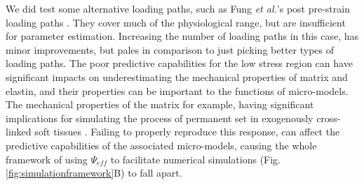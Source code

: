     We did test some alternative loading paths, such as Fung \textit{et al.}'s post pre-strain loading paths \cite{fung_pseudoelasticity_1979}. They cover much of the physiological range, but are insufficient for parameter estimation. Increasing the number of loading paths in this case, has minor improvements, but pales in comparison to just picking better types of loading paths. The poor predictive capabilities for the low stress region can have significant impacts on underestimating the mechanical properties of matrix and elastin, and their properties can be important to the functions of micro-models. The mechanical properties of the matrix for example, having significant implications for simulating the process of permanent set in exogenously cross-linked soft tissues \cite{zhang_modeling_2017}. Failing to properly reproduce this response, can affect the predictive capabilities of the associated micro-models, causing the whole framework of using $\Psi_{eff}$ to facilitate numerical simulations (Fig. \ref{fig:simulationframework}B) to fall apart. 
    
    
    
	

 









